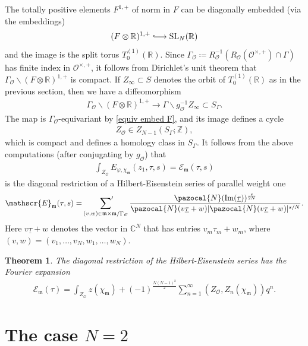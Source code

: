 \documentclass[a4paper,11pt]{amsart} %
\newcommand{\8}{\infty}
\newcommand{\Z}{\mathbb{Z}}
\newcommand{\tauud}{\underline{\tau}}
\newcommand{\SL}{\mathrm{SL}}
\newcommand{\Escr}{\mathscr{E}}
\newcommand{\R}{\mathbb{R}}
\newcommand{\C}{\mathbb{C}}
\newcommand{\m}{\mathfrak{m}}
\newcommand{\N}{\pazocal{N}}
\newcommand{\Ocal}{\mathcal{O}}
\newcommand{\im}{\mathrm{Im}}
\newcommand{\hooklongrightarrow}{\lhook\joinrel\longrightarrow}
\theoremstyle{mytheoremstyle}
\newtheorem{thm}{Theorem}[section]
\theoremstyle{remark}
\numberwithin{equation}{section}
\begin{document}
The totally positive elements $F^{1,+}$ of norm in $F$ can be diagonally embedded (via the embeddings)
 \begin{align}
(F\otimes \R)^{1,+} \hooklongrightarrow \SL_N(\R)
\end{align}
and the image is the split torus $T_0^{(1)}(\R)$. Since $\Gamma_\Ocal \coloneqq R_\Ocal^{-1}(R_\Ocal(\Ocal^{\times,+}) \cap \Gamma)$ has finite index in $\Ocal^{\times,+}$, it follows from Dirichlet's unit theorem that $\Gamma_\Ocal \backslash (F\otimes \R)^{1,+}$ is compact.
If $Z_\8 \subset S$ denotes the orbit of $T_0^{(1)}(\R)$ as in the previous section, then we have a diffeomorphism
\begin{align}
\Gamma_\Ocal \backslash (F\otimes \R)^{1,+} \longrightarrow \Gamma \backslash g_\Ocal^{-1} Z_\8 \subset S_\Gamma.
\end{align}
The map is $\Gamma_\Ocal$-equivariant by \eqref{equiv embed F}, and its image defines a cycle
\begin{align}
Z_\Ocal \in Z_{N-1}(S_\Gamma;\Z),
\end{align}
which is compact and defines a homology class in $S_\Gamma$. It follows from the above computations (after conjugating by $g_\Ocal$) that
\begin{align}
\int_{Z_\Ocal} E_{\varphi,\chi_\m}(z_1,\tau,s)= \Escr_\m(\tau, s)
\end{align}
is the diagonal restriction of a Hilbert-Eisenstein series of parallel weight one
\begin{align}
\Escr_\m(\tau, s) = \sideset{}{^{\prime}}\sum_{(v,w) \in \m\times \m/\Gamma_\Ocal}\frac{\N(\im(\tauud))^{\frac{s}{2N}}}{ \N(v\tauud+w)\lvert \N(v\tauud+w)\rvert^{s/N}}.
\end{align}
Here $v\tauud+w$ denotes the vector in $\C^N$ that has entries $v_m \tau_m+w_m$, where $(v,w)=(v_1, \dots,v_N,w_1, \dots,w_N)$.
\begin{thm} \label{diagonal restriction}
The diagonal restriction of the Hilbert-Eisenstein series has the Fourier expansion
\begin{align}
\Escr_{\m}(\tau)=\int_{Z_\Ocal} z(\chi_\m)+(-1)^{\frac{N(N-1)^2}{2}}\sum_{n=1}^\8 (Z_\Ocal,Z_n(\chi_\m) ) q^n.
\end{align}
\end{thm}

 

\section{The case $N=2$} \label{caseN2}
\end{document}
